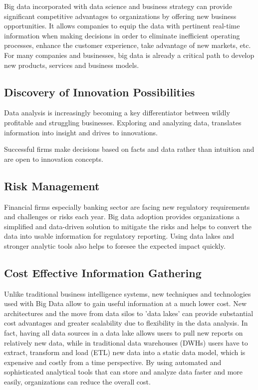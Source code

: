 \documentclass[sigconf]{acmart}
\begin{document}
Big data incorporated with data science and business strategy can provide significant competitive advantages to organizations by offering new business opportunities. It allows companies to equip the data with pertinent real-time information when making decisions in order to eliminate inefficient operating processes, enhance the customer experience, take advantage of new markets, etc. For many companies and businesses, big data is already a critical path to develop new products, services and business models\cite{accenture-next-generation-financial}.

\subsection{Discovery of Innovation Possibilities}
Data analysis is increasingly becoming a key differentiator between wildly profitable and struggling businesses. Exploring and analyzing data, translates information into insight and drives to innovations\cite{bigdata-innovations}.

Successful firms make decisions based on facts and data rather than intuition and are open to innovation concepts. 


\subsection{Risk Management}
Financial firms especially banking sector are facing new regulatory requirements and challenges or risks each year. Big data adoption provides organizations a simplified and data-driven solution to mitigate the risks and helps to convert the data into usable information for regulatory reporting. Using data lakes and stronger analytic tools   also helps to foresee the expected impact quickly\cite{the-real-world-use-of-big-data-935}.

\subsection{Cost Effective Information Gathering}

Unlike traditional business intelligence systems, new techniques and technologies used with Big Data allow to gain useful information at a much lower cost. New architectures and the move from data silos to 'data lakes' can provide substantial cost advantages and greater scalability due to flexibility in the data analysis. In fact, having all data sources in a data lake allows users to pull new reports on relatively new data, while in traditional data warehouses (DWHs) users have to extract, transform and load (ETL) new data into a static data model, which is expensive and costly from a time perspective. By using automated and sophisticated analytical tools that can store and analyze data faster and more easily, organizations can reduce the overall cost\cite{accenture-next-generation-financial}.
\end{document}

